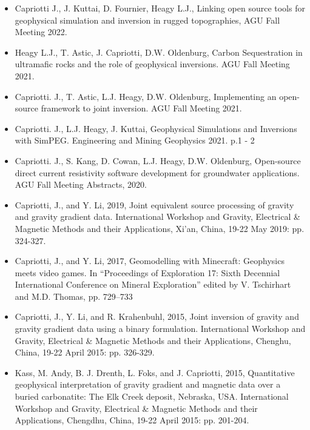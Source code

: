 \begin{itemize}
\item Capriotti J., J. Kuttai, D. Fournier, Heagy L.J., Linking open source tools for geophysical simulation and inversion in rugged topographies, AGU Fall Meeting 2022.
\item Heagy L.J., T. Astic, J. Capriotti, D.W. Oldenburg, Carbon Sequestration in ultramafic rocks and the role of geophysical inversions. AGU Fall Meeting 2021.
\item Capriotti. J., T. Astic, L.J. Heagy, D.W. Oldenburg, Implementing an open-source framework to joint inversion. AGU Fall Meeting 2021.
\item Capriotti. J., L.J. Heagy, J. Kuttai, Geophysical Simulations and Inversions with SimPEG. Engineering and Mining Geophysics 2021. p.1 - 2
\item Capriotti. J., S. Kang, D. Cowan, L.J. Heagy, D.W. Oldenburg, Open-source direct current resistivity software development for groundwater applications. AGU Fall Meeting Abstracts, 2020.
\item Capriotti, J., and Y. Li, 2019, Joint equivalent source processing of gravity and gravity gradient data. International Workshop and Gravity, Electrical \& Magnetic Methods and their Applications, Xi'an, China, 19-22 May 2019: pp. 324-327.
\item Capriotti, J., and Y. Li, 2017, Geomodelling with Minecraft: Geophysics meets video games. In “Proceedings of Exploration 17: Sixth Decennial International Conference on Mineral Exploration” edited by V. Tschirhart and M.D. Thomas, pp. 729–733
\item Capriotti, J., Y. Li, and R. Krahenbuhl, 2015, Joint inversion of gravity and gravity gradient data using a binary formulation. International Workshop and Gravity, Electrical \& Magnetic Methods and their Applications, Chenghu, China, 19-22 April 2015: pp. 326-329.
\item Kass, M. Andy, B. J. Drenth, L. Foks, and J. Capriotti, 2015, Quantitative geophysical interpretation of gravity gradient and magnetic data over a buried carbonatite: The Elk Creek deposit, Nebraska, USA. International Workshop and Gravity, Electrical \& Magnetic Methods and their Applications, Chengdhu, China, 19-22 April 2015: pp. 201-204.
\end{itemize}
